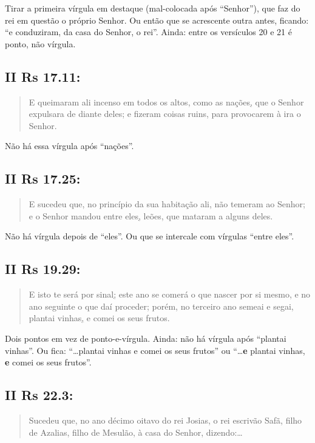 Tirar a primeira vírgula em destaque (mal-colocada após ``Senhor''), que faz do rei em questão o próprio Senhor. Ou então que se acrescente outra antes, ficando: ``e conduziram, da casa do Senhor, o rei''. Ainda: entre os versículos 20 e 21 é ponto, não vírgula.

\subsection{II Rs 17.11:}
\begin{quote}
    \small
E queimaram ali incenso em todos os altos, como as nações\uline{,} que o Senhor expulsara de diante deles; e fizeram coisas ruins, para provocarem à ira o Senhor.
\end{quote}

Não há essa vírgula após ``nações''.

\subsection{II Rs 17.25:}
\begin{quote}
    \small
E sucedeu que, no princípio da sua habitação ali, não temeram ao Senhor; e o Senhor mandou entre eles\uline{,} leões, que mataram a alguns deles.
\end{quote}

Não há vírgula depois de ``eles''. Ou que se intercale com vírgulas
``entre eles''.

\subsection{II Rs 19.29:}
\begin{quote}
    \small
E isto te será por sinal\uline{;} este ano se comerá o que nascer por si mesmo, e no ano seguinte o que daí proceder; porém, no terceiro ano semeai e segai, plantai vinhas\uline{,} e comei os seus frutos.
\end{quote}

Dois pontos em vez de ponto-e-vírgula. Ainda: não há vírgula após ``plantai vinhas''. Ou fica: ``\ldots plantai vinhas e comei os seus frutos'' ou ``\ldots \textbf{e} plantai vinhas, \textbf{e} comei os seus frutos''.

\subsection{II Rs 22.3:}
\begin{quote}
    \small
Sucedeu que, no ano décimo oitavo do rei Josias, o rei  escrivão Safã, filho de Azalias, filho de Mesulão, à casa do Senhor, dizendo:\ldots
\end{quote}

